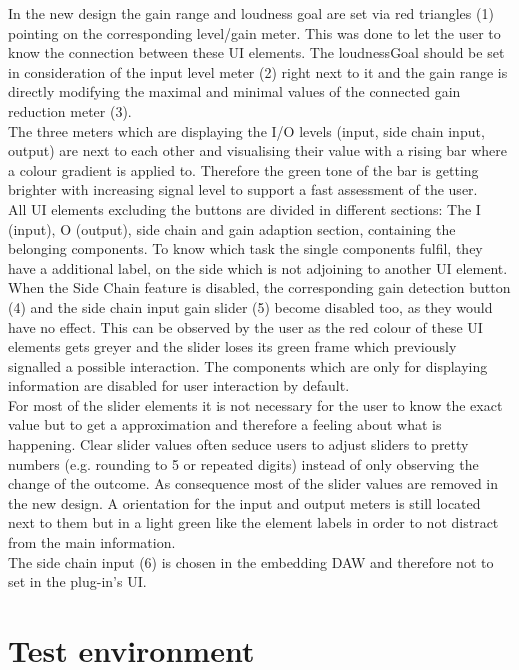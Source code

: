 In the new design the gain range and loudness goal are set via red triangles (1) pointing on the corresponding level/gain meter. This was done to let the user to know the connection between these UI elements. The loudnessGoal should be set in consideration of the input level meter (2) right next to it and the gain range is directly modifying the maximal and minimal values of the connected gain reduction meter (3).\\
The three meters which are displaying the I/O levels (input, side chain input, output) are next to each other and visualising their value with a rising bar where a colour gradient is applied to. Therefore the green tone of the bar is getting brighter with increasing signal level to support a fast assessment of the user.\\
All UI elements excluding the buttons are divided in different sections: The I (input), O (output), side chain and gain adaption section, containing the belonging components. To know which task the single components fulfil, they have a additional label, on the side which is not adjoining to another UI element.\\
When the Side Chain feature is disabled, the corresponding gain detection button (4) and the side chain input gain slider (5) become disabled too, as they would have no effect. This can be observed by the user as the red colour of these UI elements gets greyer and the slider loses its green frame which previously signalled a possible interaction. The components which are only for displaying information are disabled for user interaction by default.\\
For most of the slider elements it is not necessary for the user to know the exact value but to get a approximation and therefore a feeling about what is happening. Clear slider values often seduce users to adjust sliders to pretty numbers (e.g. rounding to 5 or repeated digits) instead of only observing the change of the outcome. As consequence most of the slider values are removed in the new design. A orientation for the input and output meters is still located next to them but in a light green like the element labels in order to not distract from the main information.\\
The side chain input (6) is chosen in the embedding DAW and therefore not to set in the plug-in’s UI.\\

\section{Test environment}

